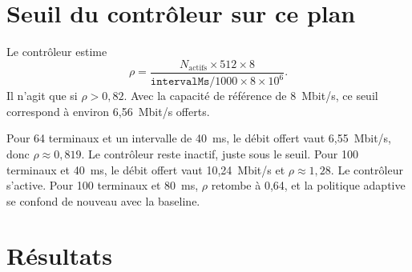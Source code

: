 \documentclass[11pt,a4paper]{article}
\begin{document}
\section{Seuil du contrôleur sur ce plan}

Le contrôleur estime
\[
  \rho = \frac{N_{\mathrm{actifs}}\times 512 \times 8}{\texttt{intervalMs}/1000 \times 8\times 10^{6}}.
\]
Il n'agit que si $\rho > 0{,}82$. Avec la capacité de référence de 8~Mbit/s, ce seuil correspond à environ 6,56~Mbit/s offerts.

Pour 64 terminaux et un intervalle de 40~ms, le débit offert vaut 6,55~Mbit/s, donc $\rho \approx 0{,}819$. Le contrôleur reste inactif, juste sous le seuil. Pour 100 terminaux et 40~ms, le débit offert vaut 10,24~Mbit/s et $\rho \approx 1{,}28$. Le contrôleur s'active. Pour 100 terminaux et 80~ms, $\rho$ retombe à 0,64, et la politique adaptive se confond de nouveau avec la baseline.

\section{Résultats}
\end{document}
